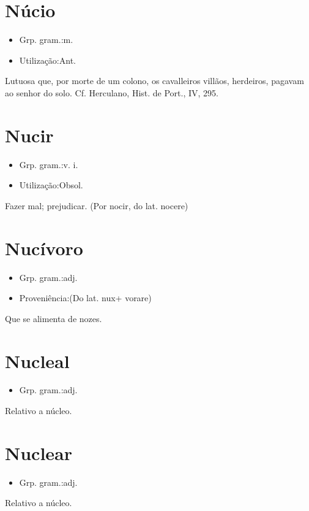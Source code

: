 \section{Núcio}
\begin{itemize}
\item {Grp. gram.:m.}
\end{itemize}
\begin{itemize}
\item {Utilização:Ant.}
\end{itemize}
Lutuosa que, por morte de um colono, os cavalleiros villãos, herdeiros, pagavam ao senhor do solo. Cf. Herculano, \textunderscore Hist. de Port.\textunderscore , IV, 295.
\section{Nucir}
\begin{itemize}
\item {Grp. gram.:v. i.}
\end{itemize}
\begin{itemize}
\item {Utilização:Obsol.}
\end{itemize}
Fazer mal; prejudicar.
(Por \textunderscore nocir\textunderscore , do lat. \textunderscore nocere\textunderscore )
\section{Nucívoro}
\begin{itemize}
\item {Grp. gram.:adj.}
\end{itemize}
\begin{itemize}
\item {Proveniência:(Do lat. \textunderscore nux\textunderscore  + \textunderscore vorare\textunderscore )}
\end{itemize}
Que se alimenta de nozes.
\section{Nucleal}
\begin{itemize}
\item {Grp. gram.:adj.}
\end{itemize}
Relativo a núcleo.
\section{Nuclear}
\begin{itemize}
\item {Grp. gram.:adj.}
\end{itemize}
Relativo a núcleo.
